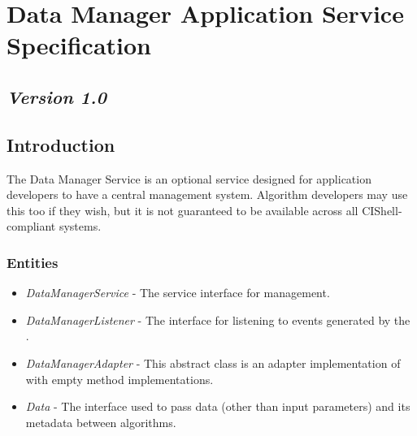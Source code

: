 \chapter{Data Manager Application Service Specification}

\section*{\textit{Version 1.0}}

\section{Introduction}

The Data Manager Service is an optional service designed for application
developers to have a central  management system. Algorithm
developers may use this too if they wish, but it is not guaranteed to be
available across all CIShell-compliant systems.

\subsection{Entities}

\begin{itemize}
  \item \textit{DataManagerService} - The service interface for 
  management.
  \item \textit{DataManagerListener} - The interface for listening to events
  generated by the .
  \item \textit{DataManagerAdapter} - This abstract class is an adapter
  implementation of  with empty method
  implementations.
  \item \textit{Data} - The interface used to pass data (other than
  input parameters) and its metadata between algorithms.
\end{itemize}

\orgcishellappservicedatamanager{}
